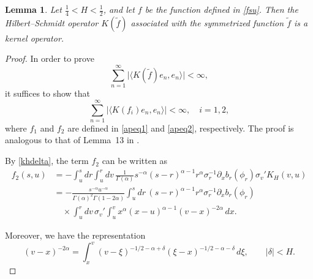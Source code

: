 \documentclass[preprint,12pt]{elsarticle}
\newtheorem{lemma}[theorem]{Lemma}
\theoremstyle{definition}  %
\theoremstyle{plain}  %
\begin{document}
\begin{lemma}
   Let $\tfrac{1}{4} < H < \tfrac{1}{2}$, and let $f$ be the function defined in \eqref{fsu}. Then the Hilbert–Schmidt operator $K(\tilde{f})$ associated with the symmetrized function $\tilde{f}$ is a kernel operator.
\end{lemma}
\begin{proof} 
In order to prove 
\[
   \sum_{n=1}^\infty \big|\langle K(\tilde{f})e_n, e_n \rangle \big| < \infty,
\]
it suffices to show that
\[
   \sum_{n=1}^\infty \big|\langle K(f_i)e_n, e_n \rangle \big| < \infty, 
   \quad i=1,2,
\]
where $f_1$ and $f_2$ are defined in \eqref{apeq1} and \eqref{apeq2}, respectively.  
The proof is analogous to that of Lemma~13 in \cite{Nualart}.  

By \eqref{khdelta}, the term $f_2$ can be written as
\begin{align*}
    f_2(s,u)
    &= - \int_u^s \! dr \int_u^r \! dv \,
       \frac{1}{\Gamma(\alpha)} s^{-\alpha} (s-r)^{\alpha-1} r^\alpha 
       \sigma_r^{-1}\partial_x b_r(\phi_r) \sigma_v' K_H(v,u) \\
    &= -\frac{s^{-\alpha} u^{-\alpha}}{\Gamma(\alpha)^2 \Gamma(1-2\alpha)}
       \int_u^s \! dr \,(s-r)^{\alpha-1} r^\alpha 
       \sigma_r^{-1}\partial_x b_r(\phi_r) \\
    &\quad \times \int_u^r \! dv \, \sigma_v' 
       \int_u^v x^\alpha (x-u)^{\alpha-1}(v-x)^{-2\alpha}\, dx .
\end{align*}


Moreover, we have the representation
\begin{equation}\label{eq:frac-rep}
   (v-x)^{-2\alpha} 
   = \int_x^v (v-\xi)^{-1/2-\alpha+\delta}(\xi-x)^{-1/2-\alpha-\delta}\, d\xi, 
   \qquad |\delta|<H .
\end{equation}


\end{proof}
\end{document}
